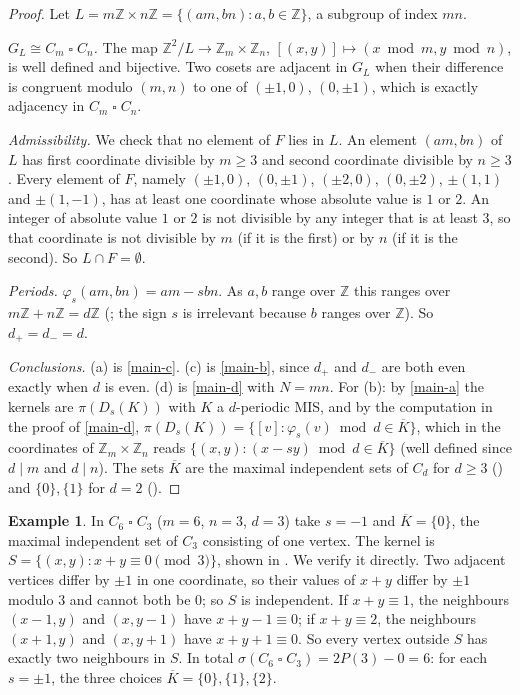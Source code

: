 \documentclass[11pt]{article}
\theoremstyle{plain}
\theoremstyle{definition}
\newtheorem{example}[example]{Example}
\theoremstyle{remark}
\newcommand{\Z}{\mathbb{Z}}
\newcommand{\T}{\mathbin{\square}}
\newcommand{\Dg}[2]{D_{#1}(#2)}
\newcommand{\Per}{P}
\begin{document}
\begin{proof}
Let $L = m\Z \times n\Z = \{(am, bn) : a, b \in \Z\}$, a subgroup of index $mn$.

\emph{$G_L \cong C_m \T C_n$.} The map $\Z^2/L \to \Z_m \times \Z_n$,
$[(x,y)] \mapsto (x \bmod m, y \bmod n)$, is well defined and bijective. Two cosets are
adjacent in $G_L$ when their difference is congruent modulo $(m,n)$ to one of $(\pm 1, 0)$,
$(0, \pm 1)$, which is exactly adjacency in $C_m \T C_n$.

\emph{Admissibility.} We check that no element of $F$ lies in $L$. An element $(am, bn)$ of
$L$ has first coordinate divisible by $m \ge 3$ and second coordinate divisible by $n \ge 3$.
Every element of $F$, namely $(\pm 1, 0)$, $(0, \pm 1)$, $(\pm 2, 0)$, $(0, \pm 2)$,
$\pm(1, 1)$ and $\pm(1, -1)$, has at least one coordinate whose absolute value is $1$ or $2$.
An integer of absolute value $1$ or $2$ is not divisible by any integer that is at least $3$,
so that coordinate is not divisible by $m$ (if it is the first) or by $n$ (if it is the
second). So $L \cap F = \emptyset$.

\emph{Periods.} $\varphi_s(am, bn) = am - sbn$. As $a, b$ range over $\Z$ this ranges over
$m\Z + n\Z = d\Z$ (; the sign $s$ is irrelevant because $b$ ranges over
$\Z$). So $d_{+} = d_{-} = d$.

\emph{Conclusions.} (a) is \ref{main-c}. (c) is \ref{main-b},
since $d_{+}$ and $d_{-}$ are both even exactly when $d$ is even. (d) is
\ref{main-d} with $N = mn$. For (b): by \ref{main-a} the kernels
are $\pi(\Dg{s}{K})$ with $K$ a $d$-periodic MIS, and by the computation in the proof of
\ref{main-d}, $\pi(\Dg{s}{K}) = \{[v] : \varphi_s(v) \bmod d \in
\overline{K}\}$, which in the coordinates of $\Z_m \times \Z_n$ reads
$\{(x,y) : (x - sy) \bmod d \in \overline{K}\}$ (well defined since $d \mid m$ and
$d \mid n$). The sets $\overline{K}$ are the maximal independent sets of $C_d$ for $d \ge 3$
() and $\{0\}, \{1\}$ for $d = 2$ ().
\end{proof}

\begin{example}\label{ex:c6c3}
In $C_6 \T C_3$ ($m = 6$, $n = 3$, $d = 3$) take $s = -1$ and $\overline{K} = \{0\}$, the
maximal independent set of $C_3$ consisting of one vertex. The kernel is
$S = \{(x,y) : x + y \equiv 0 \pmod 3\}$, shown in . We verify it directly.
Two adjacent vertices differ by $\pm 1$ in one coordinate, so their values of $x + y$ differ by
$\pm 1$ modulo $3$ and cannot both be $0$; so $S$ is independent. If $x + y \equiv 1$, the
neighbours $(x - 1, y)$ and $(x, y - 1)$ have $x + y - 1 \equiv 0$; if $x + y \equiv 2$, the
neighbours $(x + 1, y)$ and $(x, y + 1)$ have $x + y + 1 \equiv 0$. So every vertex outside
$S$ has exactly two neighbours in $S$. In total
$\sigma(C_6 \T C_3) = 2\Per(3) - 0 = 6$: for each $s = \pm 1$, the three choices
$\overline{K} = \{0\}, \{1\}, \{2\}$.
\end{example}
\end{document}
